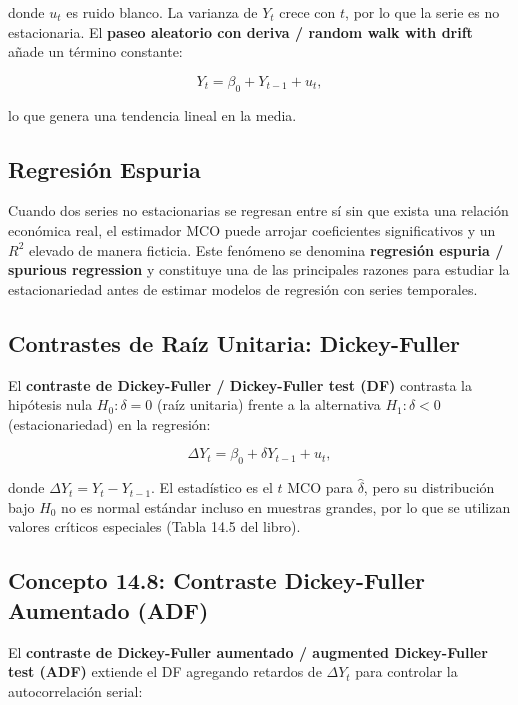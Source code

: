 \documentclass[12pt]{article}
\begin{document}
donde $u_t$ es ruido blanco. La varianza de $Y_t$ crece con $t$, por lo que la serie es no estacionaria. El \textbf{paseo aleatorio con deriva / random walk with drift} a\~nade un t\'ermino constante:

\begin{equation}
  Y_t = \beta_0 + Y_{t-1} + u_t,
  \label{eq:rwd}
\end{equation}

lo que genera una tendencia lineal en la media.

\subsection{Regresi\'on Espuria}

Cuando dos series no estacionarias se regresan entre s\'i sin que exista una relaci\'on econ\'omica real, el estimador MCO puede arrojar coeficientes significativos y un $R^2$ elevado de manera ficticia. Este fen\'omeno se denomina \textbf{regresi\'on espuria / spurious regression} y constituye una de las principales razones para estudiar la estacionariedad antes de estimar modelos de regresi\'on con series temporales.

\subsection{Contrastes de Ra\'iz Unitaria: Dickey-Fuller}

El \textbf{contraste de Dickey-Fuller / Dickey-Fuller test (DF)} contrasta la hip\'otesis nula $H_0\colon \delta = 0$ (ra\'iz unitaria) frente a la alternativa $H_1\colon \delta < 0$ (estacionariedad) en la regresi\'on:

\begin{equation}
  \Delta Y_t = \beta_0 + \delta Y_{t-1} + u_t,
  \label{eq:df}
\end{equation}

donde $\Delta Y_t = Y_t - Y_{t-1}$. El estad\'istico es el $t$ MCO para $\hat\delta$, pero su distribuci\'on bajo $H_0$ no es normal est\'andar incluso en muestras grandes, por lo que se utilizan valores cr\'iticos especiales (Tabla 14.5 del libro).

\subsection{Concepto 14.8: Contraste Dickey-Fuller Aumentado (ADF)}

El \textbf{contraste de Dickey-Fuller aumentado / augmented Dickey-Fuller test (ADF)} extiende el DF agregando retardos de $\Delta Y_t$ para controlar la autocorrelaci\'on serial:
\end{document}
